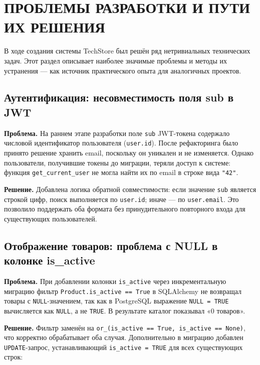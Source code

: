 \documentclass[14pt,a4paper]{extreport}
\begin{document}
\chapter{ПРОБЛЕМЫ РАЗРАБОТКИ И ПУТИ ИХ РЕШЕНИЯ}

В ходе создания системы TechStore был решён ряд нетривиальных технических задач. Этот раздел описывает наиболее значимые проблемы и методы их устранения — как источник практического опыта для аналогичных проектов.

\section{Аутентификация: несовместимость поля sub в JWT}

\textbf{Проблема.} На раннем этапе разработки поле \texttt{sub} JWT-токена содержало числовой идентификатор пользователя (\texttt{user.id}). После рефакторинга было принято решение хранить email, поскольку он уникален и не изменяется. Однако пользователи, получившие токены до миграции, теряли доступ к системе: функция \texttt{get\_current\_user} не могла найти их по email в строке вида \texttt{"42"}.

\textbf{Решение.} Добавлена логика обратной совместимости: если значение \texttt{sub} является строкой цифр, поиск выполняется по \texttt{user.id}; иначе — по \texttt{user.email}. Это позволило поддержать оба формата без принудительного повторного входа для существующих пользователей.

\section{Отображение товаров: проблема с NULL в колонке is\_active}

\textbf{Проблема.} При добавлении колонки \texttt{is\_active} через инкрементальную миграцию фильтр \texttt{Product.is\_active == True} в SQLAlchemy не возвращал товары с \texttt{NULL}-значением, так как в PostgreSQL выражение \texttt{NULL = TRUE} вычисляется как \texttt{NULL}, а не \texttt{TRUE}. В результате каталог показывал «0 товаров».

\textbf{Решение.} Фильтр заменён на \texttt{or\_(is\_active == True, is\_active == None)}, что корректно обрабатывает оба случая. Дополнительно в миграцию добавлен \texttt{UPDATE}-запрос, устанавливающий \texttt{is\_active = TRUE} для всех существующих строк:
\end{document}
